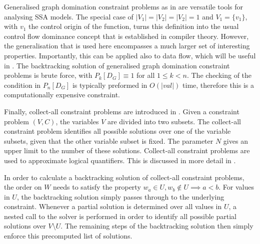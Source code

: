     Generalised graph domination constraint problems as in 
    are versatile tools for analysing SSA models.
    The special case of $|V_1|=|V_2|=|V_2|=1$ and $V_1=\{v_1\}$,
    with $v_1$ the control origin of the function, turns this definition into
    the usual control flow dominance concept that is established in compiler
    theory.
    However, the generalisation that is used here encompasses a much larger
    set of interesting properties.
    Importantly, this can be applied also to data flow, which will be useful in
    .
    The backtracking solution of generalised graph domination constraint
    problems is brute force, with $P_k[D_G]\equiv 1$ for all $1\leq k<n$.
    The checking of the condition in $P_n[D_G]$ is typically preformed in
    $O(|val|)$ time, therefore this is a computationally expensive constraint.

    Finally, collect-all constraint problems are introduced in
    .
    Given a constraint problem $(V,C)$, the variables $V$ are divided into
    two subsets.
    The collect-all constraint problem identifies all possible solutions over
    one of the variable subsets, given that the other variable subset is fixed.
    The parameter $N$ gives an upper limit to the number of these solutions.
    Collect-all constraint problems are used to approximate logical quantifiers.
    This is discussed in more detail in .

    In order to calculate a backtracking solution of collect-all constraint
    problems, the order on $W$ needs to satisfy the property
    $w_a\in U,w_b\notin U\implies a<b$.
    For values in $U$, the backtracking solution simply passes through to the
    underlying constraint.
    Whenever a partial solution is determined over all values in $U$, a nested
    call to the solver is performed in order to identify all possible partial
    solutions over $V\setminus U$.
    The remaining steps of the backtracking solution then simply enforce this
    precomputed list of solutions.


